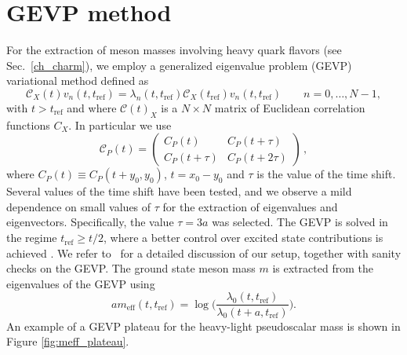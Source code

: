 \chapter{GEVP method}
\label{apex_GEVP}

For the extraction of meson masses involving heavy quark flavors (see Sec.~\ref{ch_charm}), we employ a generalized eigenvalue problem (GEVP) variational method defined as 
\begin{equation}\label{eq:gevp_sec3}
 	\mathit{\mathcal{C}}_X(t) v_n(t,t_{\mathrm{ref}}) = \lambda_n(t,t_{\mathrm{ref}}) \mathit{\mathcal{C}}_X(t_{\mathrm{ref}})v_n(t,t_{\mathrm{ref}}) \qquad n=0,\ldots,N-1 ,
\end{equation}
with $t>t_{\mathrm{ref}}$ and where $\mathit{\mathcal{C}}(t)_X$ is a $N\times N$ matrix of Euclidean correlation functions $C_X$. In particular we use
\begin{equation}
 	\mathit{\mathcal{C}}_{P}(t) = \left(\begin{matrix}
 		C_{P}(t)  &  C_{P}(t+\tau)
 		\\
 		C_{P}(t+\tau)  & C_{P}(t+2\tau)
 	\end{matrix}\right) \,,
\label{eq:gevp_matrix}
\end{equation}
where $C_P(t)\equiv C_P(t+y_0,y_0)$, $t=x_0-y_0$ and $\tau$ is the value of the time shift. Several values of the time shift have been tested, and we observe a mild dependence on small values of $\tau$ for the extraction of eigenvalues and eigenvectors. Specifically, the value $\tau=3a$ was selected. The GEVP  is solved in the regime  $t_{\mathrm{ref}} \geq t/2$, where a better control over excited state contributions is achieved \cite{Blossier:2009kd}. We refer to~\citep{charm} for a detailed discussion of our setup, together with sanity checks on the GEVP. The ground state meson mass $m$ is extracted from the eigenvalues of the GEVP using 
\begin{equation}\label{eq:eff_en_gevp}
	am_{\mathrm{eff}}(t,t_{\mathrm{ref}})=\log\bigg(\frac{\lambda_0(t,t_{\mathrm{ref}})}{\lambda_0(t+a,t_{\mathrm{ref}})}\bigg).
\end{equation}
An example of a GEVP plateau for the heavy-light pseudoscalar mass is shown in Figure \ref{fig:meff_plateau}. 
 

